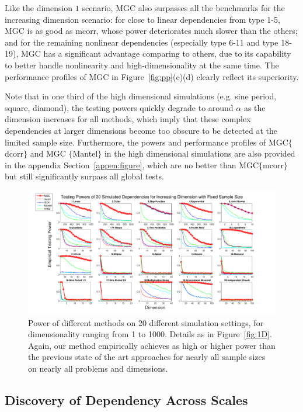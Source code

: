 \documentclass[11pt]{article}
\begin{document}
Like the dimension $1$ scenario, MGC also surpasses all the benchmarks for the increasing dimension scenario: for close to linear dependencies from type 1-5, MGC is as good as mcorr, whose power deteriorates much slower than the others; and for the remaining nonlinear dependencies (especially type 6-11 and type 18-19), MGC has a significant advantage comparing to others, due to its capability to better handle nonlinearity and high-dimensionality at the same time. The performance profiles of MGC in Figure~\ref{fig:pp}(c)(d) clearly reflect its superiority.

Note that in one third of the high dimensional simulations (e.g. sine period, square, diamond), the testing powers quickly degrade to around $\alpha$ as the dimension increases for all methods, which imply that these complex dependencies at larger dimensions become too obscure to be detected at the limited sample size. Furthermore, the powers and performance profiles of MGC$\{$dcorr$\}$ and MGC $\{$Mantel$\}$ in the high dimensional simulations are also provided in the appendix Section~\ref{appen:figure}, which are no better than MGC$\{$mcorr$\}$ but still significantly surpass all global tests.


\begin{figure}[htbp]
\includegraphics[width=1.0\textwidth]{../Figures/Fig5}
\caption{Power of different methods on 20 different simulation settings, for dimensionality ranging from 1 to 1000.  Details as in Figure~\ref{fig:1D}.
Again, our method empirically achieves as high or higher power than the previous state of the art approaches for nearly all sample sizes on nearly all problems and dimensions.
}
\label{fig:nD}
\end{figure}

\subsection{Discovery of Dependency Across Scales}
\label{main3}
\end{document}
